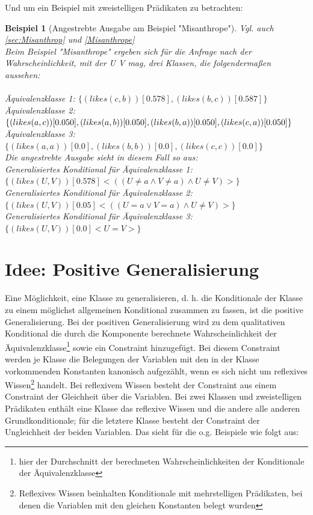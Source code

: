 \documentclass[draft]{scrreprt}
\newtheorem{Bsp}{Beispiel}[section]
\begin{document}
Und um ein Beispiel mit zweistelligen Prädikaten zu betrachten: 

	\label{Ausgabe_Misanthrope}
	\begin{Bsp}[Angestrebte Ausgabe am Beispiel "{}Misanthrope"{}]
		Vgl. auch \\ \ref{sec:Misanthrop} und \ref{Misanthrope}\\
		Beim Beispiel "{}Misanthrope"{} ergeben sich für die Anfrage nach der Wahrscheinlichkeit, mit der U V mag, drei Klassen, die folgendermaßen aussehen:\\
		\\
		Äquivalenzklasse 1: $ \{(likes(c,b))[0.578], (likes(b,c))[0.587]\} $\\
		Äquivalenzklasse 2: $ \{(likes(a,c))[0.050], (likes(a,b))[0.050], (likes(b,a))[0.050],\\
		 (likes(c,a))[0.050]\} $\\
		Äquivalenzklasse 3: $ \{(likes(a,a))[0.0], (likes(b,b))[0.0], (likes(c,c))[0.0]\} $\\
		
		\noindent
		Die angestrebte Ausgabe sieht in diesem Fall so aus:\\
		Generalisiertes Konditional für Äquivalenzklasse 1: $ \{(likes(U,V))[0.578] <((U \neq a \land V \neq a) \land U \neq V)>\} $\\
		Generalisiertes Konditional für Äquivalenzklasse 2: $ \{(likes(U,V))[0.05] <((U = a \lor V = a) \land U \neq V)>\} $\\
		Generalisiertes Konditional für Äquivalenzklasse 3: $ \{(likes(U,V))[0.0] <U = V>\} $\\
			\end{Bsp}


\section{Idee: Positive Generalisierung}
\label{PositiveGeneralisierung}

Eine Möglichkeit, eine Klasse zu generalisieren, d. h. die Konditionale der Klasse zu einem möglichst allgemeinen Konditional zusammen zu fassen, ist die positive Generalisierung. Bei der positiven Generalisierung wird zu dem qualitativen  Konditional die durch die Komponente berechnete Wahrscheinlichkeit der Äquivalenzklasse\footnote{hier der Durchschnitt der berechneten Wahrscheinlichkeiten der Konditionale der Äquivalenzklasse} sowie ein Constraint hinzugefügt. Bei diesem Constraint werden je Klasse die Belegungen der Variablen mit den in der Klasse vorkommenden Konstanten kanonisch aufgezählt, wenn es sich nicht um reflexives Wissen\footnote{Reflexives Wissen beinhalten Konditionale mit mehrstelligen Prädikaten, bei denen die Variablen mit den gleichen Konstanten belegt wurden} handelt. Bei reflexivem Wissen besteht der Constraint aus einem Constraint der Gleichheit über die Variablen. Bei zwei Klassen und zweistelligen Prädikaten enthält eine Klasse das reflexive Wissen und die andere alle anderen Grundkonditionale; für die letztere Klasse besteht der Constraint der Ungleichheit der beiden Variablen. 
Das sieht für die o.g. Beispiele wie folgt aus:
\end{document}
